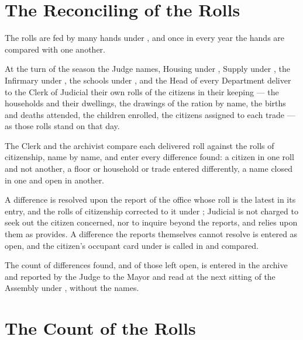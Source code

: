 \section{The Reconciling of the Rolls}
\label{sec:citizenship:reconciling-of-the-rolls}

The rolls are fed by many hands under , and once in every year the hands are compared with one another.

\begin{clauses}
\item At the turn of the season the Judge names, Housing under , Supply under , the Infirmary under , the schools under , and the Head of every Department deliver to the Clerk of Judicial their own rolls of the citizens in their keeping --- the households and their dwellings, the drawings of the ration by name, the births and deaths attended, the children enrolled, the citizens assigned to each trade --- as those rolls stand on that day.
\item The Clerk and the archivist compare each delivered roll against the rolls of citizenship, name by name, and enter every difference found: a citizen in one roll and not another, a floor or household or trade entered differently, a name closed in one and open in another.
\item A difference is resolved upon the report of the office whose roll is the latest in its entry, and the rolls of citizenship corrected to it under ; Judicial is not charged to seek out the citizen concerned, nor to inquire beyond the reports, and relies upon them as  provides. A difference the reports themselves cannot resolve is entered as open, and the citizen's occupant card under  is called in and compared.
\item The count of differences found, and of those left open, is entered in the archive and reported by the Judge to the Mayor and read at the next sitting of the Assembly under , without the names.
\end{clauses}

\section{The Count of the Rolls}
\label{sec:citizenship:count-of-the-rolls}

